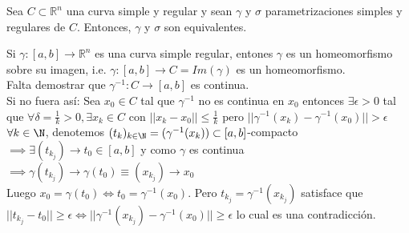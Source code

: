 
\begin{teorema}
    Sea \( C \subset \mathbb{R}^n \) una curva simple y regular y sean \( \gamma \) y \( \sigma \) parametrizaciones simples y regulares de \( C \). Entonces, \( \gamma \) y \( \sigma \) son equivalentes.
\end{teorema}


\begin{observación}
Si $\gamma: [a,b] \to \mathbb{R}^n$ es una curva simple regular, entones $\gamma$ es un homeomorfismo sobre su imagen, i.e. $\gamma: [a, b] \to C = Im(\gamma)$ es un homeomorfismo. \\
Falta demostrar que $\gamma^{-1}: C \to [a,b]$ es continua.\\
Si no fuera así: Sea $x_0 \in C$ tal que $\gamma^{-1}$ no es continua en $x_0$ entonces $\exists \epsilon > 0$ tal que $\forall \delta = \frac{1}{k} > 0, \exists x_k \in C$ con $ ||x_k - x_0|| \leq \frac{1}{k}$ pero $||\gamma^{-1}(x_k) - \gamma^{-1}(x_0)|| > \epsilon$ \\
$\forall k \in \N$, denotemos $(t_k)_{k \in \N} = (\gamma^{-1}(x_k)) \subset [a,b]$-compacto $\implies \exists (t_{k_j}) \to t_0 \in [a,b]$ y como $\gamma$ es continua $\implies \gamma(t_{k_j}) \to \gamma(t_0) \equiv (x_{k_j}) \to x_0$ \\
Luego $x_0 = \gamma(t_0) \iff t_0 = \gamma^{-1}(x_0)$. Pero $t_{k_j} = \gamma^{-1}(x_{k_j})$ satisface que $||t_{k_j} - t_0|| \geq \epsilon \iff ||\gamma^{-1}(x_{k_j}) - \gamma^{-1}(x_0)|| \geq \epsilon$ lo cual es una contradicción.
\end{observación}

